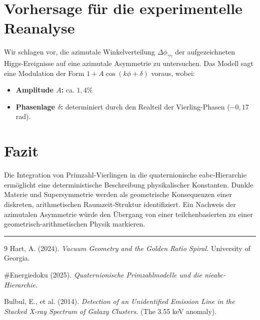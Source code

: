 \documentclass[12pt,a4paper]{article}
\begin{document}
	\section{Vorhersage für die experimentelle Reanalyse}
	Wir schlagen vor, die azimutale Winkelverteilung $\Delta\phi_{\gamma\gamma}$ der aufgezeichneten Higgs-Ereignisse auf eine azimutale Asymmetrie zu untersuchen. Das Modell sagt eine Modulation der Form $1 + A \cos(k\phi + \delta)$ voraus, wobei:
	\begin{itemize}
		\item \textbf{Amplitude $A$:} ca. $1{,}4\%$
		\item \textbf{Phasenlage $\delta$:} determiniert durch den Realteil der Vierling-Phasen ($-0{,}17$ rad).
	\end{itemize}
	
	\section{Fazit}
	Die Integration von Primzahl-Vierlingen in die quaternionische eabc-Hierarchie ermöglicht eine deterministische Beschreibung physikalischer Konstanten. Dunkle Materie und Supersymmetrie werden als geometrische Konsequenzen einer diskreten, arithmetischen Raumzeit-Struktur identifiziert. Ein Nachweis der azimutalen Asymmetrie würde den Übergang von einer teilchenbasierten zu einer geometrisch-arithmetischen Physik markieren.
	
	\vspace{1em}
	\hrule
	\vspace{1em}
	
	\begin{thebibliography}{9}
		Hart, A. (2024). \textit{Vacuum Geometry and the Golden Ratio Spiral.} University of Georgia.
		
		\#Energiedoku (2025). \textit{Quaternionische Primzahlmodelle und die nieabc-Hierarchie.}
		
		Bulbul, E., et al. (2014). \textit{Detection of an Unidentified Emission Line in the Stacked X-ray Spectrum of Galaxy Clusters.} (The 3.55 keV anomaly).
	\end{thebibliography}
	
\end{document}
